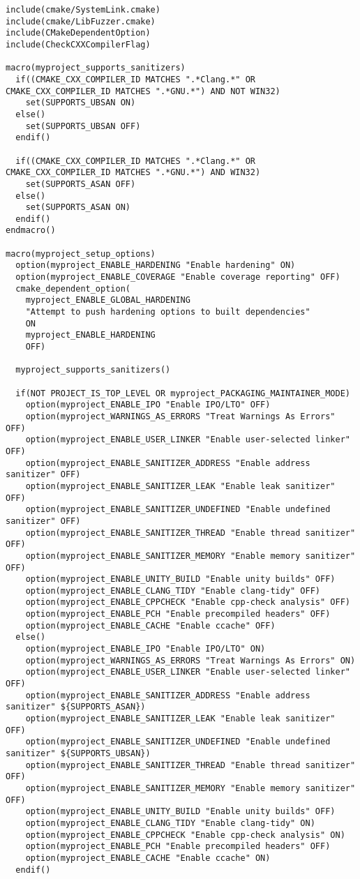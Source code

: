 \documentclass[openany]{report}
\begin{document}
\begin{verbatim}
include(cmake/SystemLink.cmake)
include(cmake/LibFuzzer.cmake)
include(CMakeDependentOption)
include(CheckCXXCompilerFlag)

macro(myproject_supports_sanitizers)
  if((CMAKE_CXX_COMPILER_ID MATCHES ".*Clang.*" OR CMAKE_CXX_COMPILER_ID MATCHES ".*GNU.*") AND NOT WIN32)
    set(SUPPORTS_UBSAN ON)
  else()
    set(SUPPORTS_UBSAN OFF)
  endif()

  if((CMAKE_CXX_COMPILER_ID MATCHES ".*Clang.*" OR CMAKE_CXX_COMPILER_ID MATCHES ".*GNU.*") AND WIN32)
    set(SUPPORTS_ASAN OFF)
  else()
    set(SUPPORTS_ASAN ON)
  endif()
endmacro()

macro(myproject_setup_options)
  option(myproject_ENABLE_HARDENING "Enable hardening" ON)
  option(myproject_ENABLE_COVERAGE "Enable coverage reporting" OFF)
  cmake_dependent_option(
    myproject_ENABLE_GLOBAL_HARDENING
    "Attempt to push hardening options to built dependencies"
    ON
    myproject_ENABLE_HARDENING
    OFF)

  myproject_supports_sanitizers()

  if(NOT PROJECT_IS_TOP_LEVEL OR myproject_PACKAGING_MAINTAINER_MODE)
    option(myproject_ENABLE_IPO "Enable IPO/LTO" OFF)
    option(myproject_WARNINGS_AS_ERRORS "Treat Warnings As Errors" OFF)
    option(myproject_ENABLE_USER_LINKER "Enable user-selected linker" OFF)
    option(myproject_ENABLE_SANITIZER_ADDRESS "Enable address sanitizer" OFF)
    option(myproject_ENABLE_SANITIZER_LEAK "Enable leak sanitizer" OFF)
    option(myproject_ENABLE_SANITIZER_UNDEFINED "Enable undefined sanitizer" OFF)
    option(myproject_ENABLE_SANITIZER_THREAD "Enable thread sanitizer" OFF)
    option(myproject_ENABLE_SANITIZER_MEMORY "Enable memory sanitizer" OFF)
    option(myproject_ENABLE_UNITY_BUILD "Enable unity builds" OFF)
    option(myproject_ENABLE_CLANG_TIDY "Enable clang-tidy" OFF)
    option(myproject_ENABLE_CPPCHECK "Enable cpp-check analysis" OFF)
    option(myproject_ENABLE_PCH "Enable precompiled headers" OFF)
    option(myproject_ENABLE_CACHE "Enable ccache" OFF)
  else()
    option(myproject_ENABLE_IPO "Enable IPO/LTO" ON)
    option(myproject_WARNINGS_AS_ERRORS "Treat Warnings As Errors" ON)
    option(myproject_ENABLE_USER_LINKER "Enable user-selected linker" OFF)
    option(myproject_ENABLE_SANITIZER_ADDRESS "Enable address sanitizer" ${SUPPORTS_ASAN})
    option(myproject_ENABLE_SANITIZER_LEAK "Enable leak sanitizer" OFF)
    option(myproject_ENABLE_SANITIZER_UNDEFINED "Enable undefined sanitizer" ${SUPPORTS_UBSAN})
    option(myproject_ENABLE_SANITIZER_THREAD "Enable thread sanitizer" OFF)
    option(myproject_ENABLE_SANITIZER_MEMORY "Enable memory sanitizer" OFF)
    option(myproject_ENABLE_UNITY_BUILD "Enable unity builds" OFF)
    option(myproject_ENABLE_CLANG_TIDY "Enable clang-tidy" ON)
    option(myproject_ENABLE_CPPCHECK "Enable cpp-check analysis" ON)
    option(myproject_ENABLE_PCH "Enable precompiled headers" OFF)
    option(myproject_ENABLE_CACHE "Enable ccache" ON)
  endif()


\end{verbatim}
\end{document}
